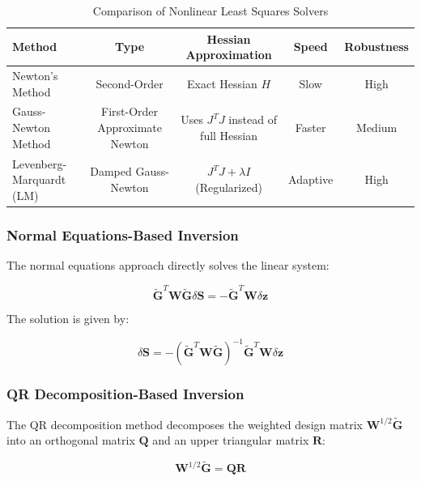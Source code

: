 \documentclass[conference]{IEEEtran}
\begin{document}
\begin{table}[h!]
\centering
\begin{tabular}{|l|c|c|c|c|}
\hline
\textbf{Method} & \textbf{Type} & \textbf{Hessian Approximation} & \textbf{Speed} & \textbf{Robustness} \\
\hline
Newton’s Method & Second-Order & Exact Hessian \( H \) & Slow & High \\
\hline
Gauss-Newton Method & First-Order Approximate Newton & Uses \( J^TJ \) instead of full Hessian & Faster & Medium \\
\hline
Levenberg-Marquardt (LM) & Damped Gauss-Newton & \( J^TJ + \lambda I \) (Regularized) & Adaptive & High \\
\hline
\end{tabular}
\caption{Comparison of Nonlinear Least Squares Solvers}
\label{tab:nls_solvers}
\end{table}

\subsubsection*{Normal Equations-Based Inversion}

The normal equations approach directly solves the linear system:

\begin{equation}
\tilde{\mathbf{G}}^T \mathbf{W} \tilde{\mathbf{G}} \delta \mathbf{S} = -\tilde{\mathbf{G}}^T \mathbf{W} \delta \mathbf{z}
\end{equation}

The solution is given by:

\begin{equation}
\delta \mathbf{S} = -(\tilde{\mathbf{G}}^T \mathbf{W} \tilde{\mathbf{G}})^{-1} \tilde{\mathbf{G}}^T \mathbf{W} \delta \mathbf{z}
\end{equation}

\subsubsection*{QR Decomposition-Based Inversion}

The QR decomposition method decomposes the weighted design matrix \( \mathbf{W}^{1/2} \tilde{\mathbf{G}} \) into an orthogonal matrix \( \mathbf{Q} \) and an upper triangular matrix \( \mathbf{R} \):

\begin{equation}
\mathbf{W}^{1/2} \tilde{\mathbf{G}} = \mathbf{Q} \mathbf{R}
\end{equation}
\end{document}
